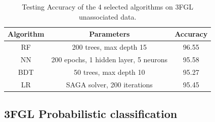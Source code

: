 \begin{table}[!h]
    \tiny
    \centering
    \renewcommand{\tabcolsep}{1mm}
\renewcommand{\arraystretch}{1.5}

    \begin{tabular}{|c|c|c|}
    \hline
    Algorithm&Parameters & Accuracy\\
    \hline
    RF& 200 trees, max depth 15  & 96.55   \\
    \hline
    NN & 200 epochs, 1 hidden layer, 5 neurons &  95.58 \\
    \hline %
    BDT & 50 trees, max depth 10    &   95.27  \\
    \hline
    LR & SAGA solver, 200 iterations & 95.45 \\
    \hline
     
    \end{tabular}

    \caption{Testing Accuracy of the 4 selected algorithms on 3FGL unassociated data.}
    \label{tab:selected_algs}
\end{table}


\subsection{3FGL Probabilistic classification} 

